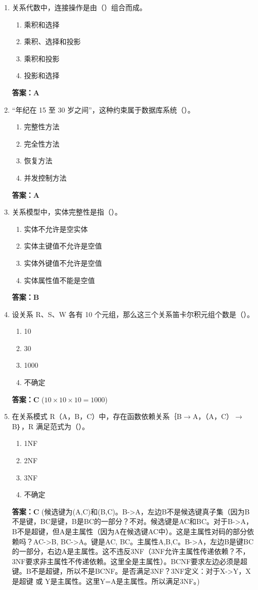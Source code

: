 \documentclass[12pt, a4paper]{article}
\begin{document}
\begin{enumerate}[label=\arabic*.]
    \item 关系代数中，连接操作是由（\quad）组合而成。
    \begin{enumerate}
        \item 乘积和选择
        \item 乘积、选择和投影
        \item 乘积和投影
        \item 投影和选择
    \end{enumerate}
    \textbf{答案：A}

    \item “年纪在 15 至 30 岁之间”，这种约束属于数据库系统（\quad）。
    \begin{enumerate}
        \item 完整性方法
        \item 完全性方法
        \item 恢复方法
        \item 并发控制方法
    \end{enumerate}
    \textbf{答案：A}

    \item 关系模型中，实体完整性是指（\quad）。
    \begin{enumerate}
        \item 实体不允许是空实体
        \item 实体主键值不允许是空值
        \item 实体外键值不允许是空值
        \item 实体属性值不能是空值
    \end{enumerate}
    \textbf{答案：B}

    \item 设关系 R、S、W 各有 10 个元组，那么这三个关系笛卡尔积元组个数是（\quad）。
    \begin{enumerate}
        \item 10
        \item 30
        \item 1000
        \item 不确定
    \end{enumerate}
    \textbf{答案：C} ($10 \times 10 \times 10 = 1000$)

    \item 在关系模式 R（A，B，C）中，存在函数依赖关系｛B$\to$A，（A，C）$\to$B｝，R 满足范式为（\quad）。
    \begin{enumerate}
        \item 1NF
        \item 2NF
        \item 3NF
        \item 不确定
    \end{enumerate}
    \textbf{答案：C} (候选键为(A,C)和(B,C)。B->A，左边B不是候选键真子集（因为B不是键，BC是键，B是BC的一部分？不对。候选键是AC和BC。对于B->A，B不是超键，但A是主属性（因为A在候选键AC中）。这是主属性对码的部分依赖吗？AC->B, BC->A。键是AC, BC。主属性A,B,C。B->A，左边B是键BC的一部分，右边A是主属性。这不违反3NF（3NF允许主属性传递依赖？不，3NF要求非主属性不传递依赖。这里全是主属性）。BCNF要求左边必须是超键。B不是超键，所以不是BCNF。是否满足3NF？3NF定义：对于X->Y，X是超键 或 Y是主属性。这里Y=A是主属性。所以满足3NF。)


\end{enumerate}
\end{document}
